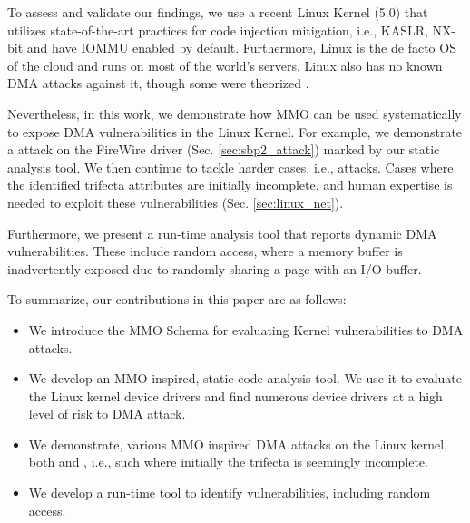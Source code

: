 To assess and validate our findings, we use a recent Linux Kernel (5.0) that utilizes state-of-the-art practices for code injection mitigation, i.e., KASLR, NX-bit and have IOMMU enabled by default. Furthermore, Linux is the de facto OS of the cloud and runs on most of the world's servers. Linux also has no known DMA attacks against it, though some were theorized \cite{MMT16,thunder}. 

Nevertheless, in this work, we demonstrate how MMO can be used systematically to expose DMA vulnerabilities in the Linux Kernel. For example, we demonstrate a \simple{} attack on the FireWire \spb{} driver (Sec. \ref{sec:sbp2_attack}) marked by our static analysis tool. 
We then continue to tackle harder cases, i.e., \compound{} attacks. Cases where the identified trifecta attributes are initially incomplete, and human expertise is needed to exploit these vulnerabilities (Sec. \ref{sec:linux_net}). 

Furthermore, we present a run-time analysis tool that reports dynamic DMA vulnerabilities. These include random access, where a memory buffer is inadvertently exposed due to randomly sharing a page with an I/O buffer.

To summarize, our contributions in this paper are as follows:
\begin{itemize}
    \item We introduce the MMO Schema for evaluating Kernel vulnerabilities to DMA attacks. 
    \item We develop an MMO inspired, static code analysis tool. We use it to evaluate the Linux kernel device drivers and find numerous device drivers at a high level of risk to DMA attack.
    \item We demonstrate, various MMO inspired DMA attacks on the Linux kernel, both \simple{} and \compound{}, i.e., such where initially the trifecta is seemingly incomplete. 
    \item We develop a run-time tool to identify \subpage{} vulnerabilities, including random access.
\end{itemize}